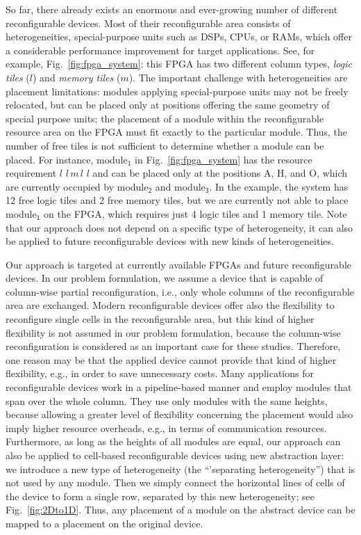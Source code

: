 \documentclass{article}
\begin{document}
So far, there already exists an enormous and ever-growing number of different
reconfigurable devices. Most of their
reconfigurable area consists of heterogeneities, special-purpose
units such as DSPs, CPUs, or RAMs, which offer a considerable performance
improvement for target applications. 
See, for example, Fig.~\ref{fig:fpga_system}: this FPGA has two
different column types,
\emph{logic tiles} ($l$) and \emph{memory tiles} ($m$).
The important challenge with heterogeneities are placement
limitations: modules applying special-purpose units may not be freely
relocated, but can be placed only at positions offering the same
geometry of special purpose units;
the placement of a module within the reconfigurable resource area on 
the FPGA must fit exactly to the particular module. 
Thus, the number of free tiles is 
not sufficient to determine whether a module can be placed. 
For instance, \textsf{module}$_\textsf{1}$ in Fig.~\ref{fig:fpga_system} 
has the resource requirement $l\,\,l\,m\,l\,\,l$ and can be placed only at 
the positions \textsf{A}, \textsf{H}, and \textsf{O}, which are currently occupied by 
\textsf{module}$_\textsf{2}$ and \textsf{module}$_\textsf{3}$. 
In the example, the system has 12 free logic tiles and 2 free memory tiles, 
but we are currently not able to place \textsf{module}$_\textsf{1}$ 
on the FPGA, which requires just 4 logic tiles and 1 memory tile. 
Note that our approach does not depend on a
specific type of heterogeneity, it can also be applied to future
reconfigurable devices with new kinds of heterogeneities. 


Our approach is targeted at currently available FPGAs and
future reconfigurable devices. In our problem formulation, we
assume a device that is capable of column-wise partial
reconfiguration, i.e., only whole columns of the reconfigurable area are
exchanged. Modern reconfigurable devices offer also the flexibility to
reconfigure single cells in the reconfigurable area, but this kind of
higher flexibility is not assumed in our problem formulation, because the
column-wise reconfiguration is considered as an important case for
these studies. Therefore, one reason may be that the applied device
cannot provide that kind of higher flexibility, e.g., in order to
save unnecessary costs. Many applications for reconfigurable devices
work in a pipeline-based manner and employ modules that span over the
whole column. They use only modules with the same heights, because allowing 
a greater level of flexibility concerning the placement would also
imply higher resource overheads, e.g., in terms of communication
resources. Furthermore, as long as the heights of all modules are
equal, our approach can also be applied to cell-based reconfigurable
devices using new abstraction layer: we introduce a new type of heterogeneity 
(the ``'separating heterogeneity'') that is not used by any module. Then we
simply connect the horizontal lines of cells of the device to form a single
row, separated by this new heterogeneity; see Fig.~\ref{fig:2Dto1D}. Thus, any
placement of a module on the abstract device can be mapped to a placement on
the original device.
\end{document}
